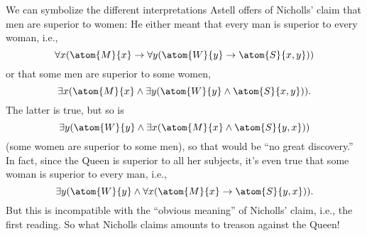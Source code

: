 We can symbolize the different interpretations Astell offers of
Nicholls' claim that men are superior to women:
He either meant that every man is superior to every woman, i.e.,
\[
\forall x(\atom{M}{x} \eif \forall y(\atom{W}{y} \eif \atom{S}{x,y}))
\]
or that some men are superior to some women,
\[
\exists x(\atom{M}{x} \eand \exists y(\atom{W}{y} \eand \atom{S}{x,y})).
\]
The latter is true, but so is
\[
\exists y(\atom{W}{y} \eand \exists x(\atom{M}{x} \eand \atom{S}{y,x}))
\]
(some women are superior to some men), so that would be ``no great
discovery.''  In fact, since the Queen is superior to all her
subjects, it's even true that some woman is superior to every man,
i.e.,
\[
\exists y(\atom{W}{y} \land \forall x(\atom{M}{x} \eif \atom{S}{y,x})).
\]
But this is incompatible with the ``obvious meaning'' of Nicholls'
claim, i.e., the first reading. So what Nicholls claims amounts to
treason against the Queen!

